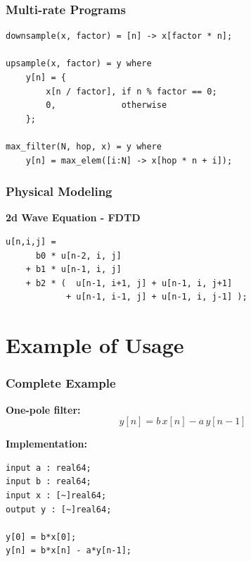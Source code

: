 \documentclass{beamer}
\begin{document}
\begin{frame}[fragile]
\frametitle{Multi-rate Programs}

\begin{center}
\begin{BVerbatim}
downsample(x, factor) = [n] -> x[factor * n];

upsample(x, factor) = y where
    y[n] = {
        x[n / factor], if n % factor == 0;
        0,             otherwise
    };

max_filter(N, hop, x) = y where
    y[n] = max_elem([i:N] -> x[hop * n + i]);
\end{BVerbatim}
\end{center}

\end{frame}


\begin{frame}[fragile]
\frametitle{Physical Modeling}

\textbf{2d Wave Equation - FDTD\footnotemark}
\begin{center}
\begin{BVerbatim}
u[n,i,j] =
      b0 * u[n-2, i, j]
    + b1 * u[n-1, i, j]
    + b2 * (  u[n-1, i+1, j] + u[n-1, i, j+1]
            + u[n-1, i-1, j] + u[n-1, i, j-1] );
\end{BVerbatim}
\end{center}

\end{frame}

\section{Example of Usage}

\begin{frame}[fragile]
\frametitle{Complete Example}

\textbf{One-pole filter\footnotemark:}
\[y[n] = b\,x[n] - a\,y[n-1]\]

\textbf{Implementation:}

\vspace{5pt}
\centering

\begin{BVerbatim}
input a : real64;
input b : real64;
input x : [~]real64;
output y : [~]real64;

y[0] = b*x[0];
y[n] = b*x[n] - a*y[n-1];
\end{BVerbatim}


\end{frame}
\end{document}
